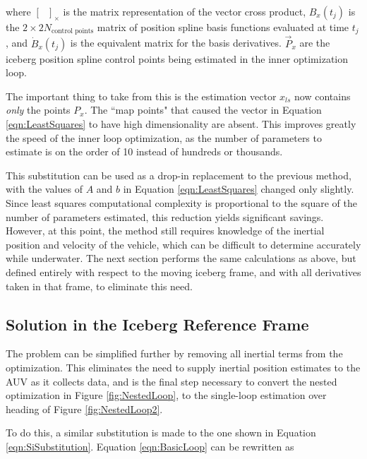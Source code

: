 where $[~~~]_\times$ is the matrix representation of the vector cross product, $B_x(t_j)$ is the $2\times2N_\text{control points}$ matrix of position spline basis functions evaluated at time $t_j$, and $\dot{B}_x(t_j)$ is the equivalent matrix for the basis derivatives. $\vec{P}_x$ are the iceberg position spline control points being estimated in the inner optimization loop.

The important thing to take from this is the estimation vector $x_{ls}$ now contains \emph{only} the points $P_x$. The ``map points" that caused the vector in Equation \ref{eqn:LeastSquares} to have high dimensionality are absent. This improves greatly the speed of the inner loop optimization, as the number of parameters to estimate is on the order of 10 instead of hundreds or thousands.

This substitution can be used as a drop-in replacement to the previous method, with the values of $A$ and $b$ in Equation \ref{eqn:LeastSquares} changed only slightly. Since least squares computational complexity is proportional to the square of the number of parameters estimated, this reduction yields significant savings. However, at this point, the method still requires knowledge of the inertial position and velocity of the vehicle, which can be difficult to determine accurately while underwater. The next section performs the same calculations as above, but defined entirely with respect to the moving iceberg frame, and with all derivatives taken in that frame, to eliminate this need. 


\subsection{Solution in the Iceberg Reference Frame}
\label{sec.MainContrib}
The problem can be simplified further by removing all inertial terms from the optimization. This eliminates the need to supply inertial position estimates to the AUV as it collects data, and is the final step necessary to convert the nested optimization in Figure \ref{fig:NestedLoop}, to the single-loop estimation over heading of Figure \ref{fig:NestedLoop2}. 

To do this, a similar substitution is made to the one shown in Equation \ref{eqn:SiSubstitution}. Equation \ref{eqn:BasicLoop} can be rewritten as

